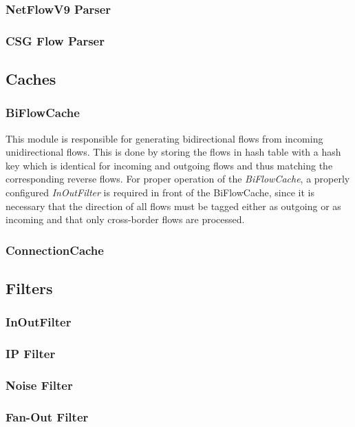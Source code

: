 \subsubsection{NetFlowV9 Parser}
\subsubsection{CSG Flow Parser} 


\subsection{Caches}
\subsubsection{BiFlowCache} This module is responsible for generating
bidirectional flows from incoming unidirectional flows. This is done by
storing the flows in hash table with a hash key which is identical for incoming
and outgoing flows and thus matching the corresponding reverse flows. For proper operation of the \emph{BiFlowCache}, a properly configured \emph{InOutFilter} is required in front of the BiFlowCache, since it is necessary that the direction of all flows must be tagged either as outgoing or as incoming and that only cross-border flows are processed.

\subsubsection{ConnectionCache}

\subsection{Filters}
\subsubsection{InOutFilter}
\subsubsection{IP Filter} 
\subsubsection{Noise Filter} 
\subsubsection{Fan-Out Filter}

